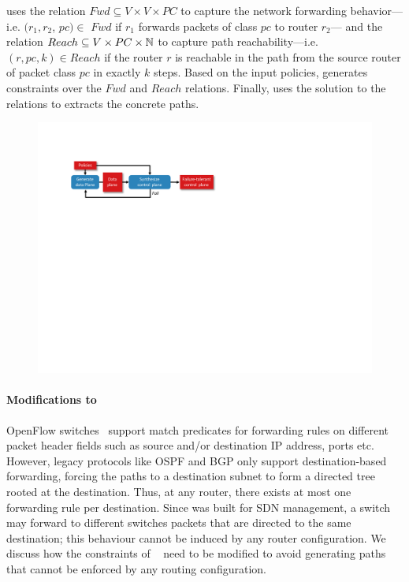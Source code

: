 \genesis uses the relation $Fwd \subseteq V \times V \times PC $  
to capture 
the network forwarding behavior---i.e. 
$(r_1, r_2$, $pc)\in$ $Fwd$ if 
$r_1$ forwards packets of class $pc$ to router $r_2$---
and 
the relation $Reach \subseteq V \times PC \times \mathbb{N}$ 
to capture
 path reachability---i.e. $(r, pc, k)\in Reach$ if 
the router $r$ is reachable in the path from the source
router of packet class $pc$ in exactly $k$ steps. Based on
the input policies, \genesis generates constraints over the $Fwd$
and $Reach$ relations. Finally, \genesis uses the solution to the relations to extracts the concrete paths.
\begin{figure}
	\centering
	\includegraphics[width=\columnwidth]{figures/architecture.pdf}
	\label{fig:architecture}
\end{figure}
\paragraph{Modifications to \genesis}
OpenFlow switches~\cite{openflow} support match predicates for
forwarding rules on different packet header fields such as source
and/or destination IP address, ports etc. However, legacy protocols
like OSPF and BGP only support destination-based forwarding, 
forcing the paths to a destination subnet to 
form a directed tree rooted at the destination. 
Thus,
at any router, there exists at most one forwarding rule per destination. 
Since \genesis was built for
SDN management,  a switch may forward to different switches
packets that are directed to the same destination;
this behaviour cannot be induced by any router
configuration. We  discuss how the
constraints of \genesis~\cite{genesis}
need to be modified to avoid generating paths that 
cannot be enforced by any routing configuration.

